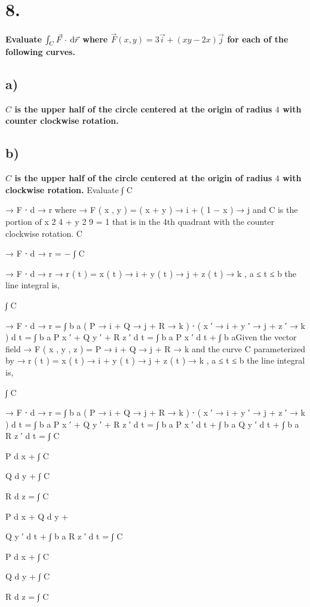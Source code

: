 \documentclass{scrartcl}
\DeclareRobustCommand*\d
{\ifmmode\mathop{}\!\mathrm{d}\else\expandafter\originald\fi}
\begin{document}
\section*{8.}

\textbf{Evaluate $\int_{C}^{} \vec{F} \cdot \, \d \vec{r}$ where $\vec{F}(x,y)=3\vec{i}+(xy-2x)\vec{j}$ for each of the following curves.}

\subsection*{a)}
\textbf{$C$ is the upper half of the circle centered at the origin of radius $4$ with counter clockwise rotation.}

\subsection*{b)}
\textbf{$C$	is the upper half of the circle centered at the origin of radius $4$ with clockwise rotation.}
Evaluate  
∫
C

→
F
⋅
d
→
r
where 
→
F
(
x
,
y
)
=
(
x
+
y
)
→
i
+
(
1
−
x
)
→
j
and 
C
is the portion of 
x
2
4
+
y
2
9
=
1
that is in the 4th quadrant with the counter clockwise rotation. 
C

→
F
⋅
d
→
r
=
−
∫
C

→
F
⋅
d
→
r
→
r
(
t
)
=
x
(
t
)
→
i
+
y
(
t
)
→
j
+
z
(
t
)
→
k
, 
a
≤
t
≤
b
the line integral is,

∫
C

→
F
⋅
d
→
r
=
∫
b
a
(
P
→
i
+
Q
→
j
+
R
→
k
)
⋅
(
x
′
→
i
+
y
′
→
j
+
z
′
→
k
)
d
t
=
∫
b
a
P
x
′
+
Q
y
′
+
R
z
′
d
t
=
∫
b
a
P
x
′
d
t
+
∫
b
aGiven the vector field 
→
F
(
x
,
y
,
z
)
=
P
→
i
+
Q
→
j
+
R
→
k
and the curve 
C
parameterized by 
→
r
(
t
)
=
x
(
t
)
→
i
+
y
(
t
)
→
j
+
z
(
t
)
→
k
, 
a
≤
t
≤
b
the line integral is,

∫
C

→
F
⋅
d
→
r
=
∫
b
a
(
P
→
i
+
Q
→
j
+
R
→
k
)
⋅
(
x
′
→
i
+
y
′
→
j
+
z
′
→
k
)
d
t
=
∫
b
a
P
x
′
+
Q
y
′
+
R
z
′
d
t
=
∫
b
a
P
x
′
d
t
+
∫
b
a
Q
y
′
d
t
+
∫
b
a
R
z
′
d
t
=
∫
C

P
d
x
+
∫
C

Q
d
y
+
∫
C

R
d
z
=
∫
C

P
d
x
+
Q
d
y
+

Q
y
′
d
t
+
∫
b
a
R
z
′
d
t
=
∫
C

P
d
x
+
∫
C

Q
d
y
+
∫
C

R
d
z
=
∫
C
\end{document}
